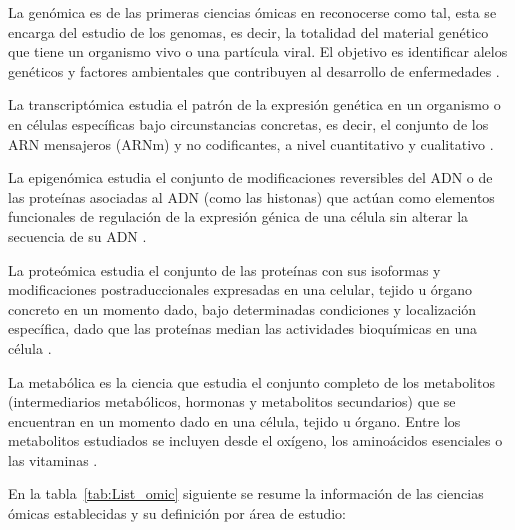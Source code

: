 La genómica es de las primeras ciencias ómicas en reconocerse como tal, esta se encarga del estudio de los genomas, es decir, la totalidad del material genético que tiene un organismo vivo o una partícula viral. El objetivo es identificar alelos genéticos y factores ambientales que contribuyen al desarrollo de enfermedades \citep{institute}.

La transcriptómica estudia el patrón de la expresión genética en un organismo o en células específicas bajo circunstancias concretas, es decir, el conjunto de los ARN mensajeros (ARNm) y no codificantes, a nivel cuantitativo y cualitativo \citep{davis2017missing}.

La epigenómica estudia el conjunto de modificaciones reversibles del ADN o de las proteínas asociadas al ADN (como las histonas) que actúan como elementos funcionales de regulación de la expresión génica de una célula sin alterar la secuencia de su ADN \citep{hasin2017multi}.

La proteómica estudia el conjunto de las proteínas con sus isoformas y modificaciones postraduccionales expresadas en una celular, tejido u órgano concreto en un momento dado, bajo determinadas condiciones y localización específica, dado que las proteínas median las actividades bioquímicas en una célula \citep{van2018precision}.

La metabólica es la ciencia que estudia el conjunto completo de los metabolitos (intermediarios metabólicos, hormonas y metabolitos secundarios) que se encuentran en un momento dado en una célula, tejido u órgano. Entre los metabolitos estudiados se incluyen desde el oxígeno, los aminoácidos esenciales o las vitaminas \citep{zhao2014lipidomics}.

En la tabla~\ref{tab:List_omic} siguiente se resume la información de las ciencias ómicas establecidas y su definición por área de estudio:

